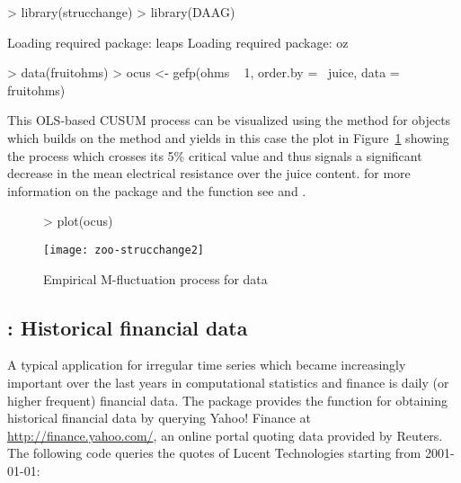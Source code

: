 \documentclass{Z}
\begin{document}
\begin{Schunk}
\begin{Sinput}
> library(strucchange)
> library(DAAG)
\end{Sinput}
\begin{Soutput}
Loading required package: leaps 
Loading required package: oz 
\end{Soutput}
\begin{Sinput}
> data(fruitohms)
> ocus <- gefp(ohms ~ 1, order.by = ~juice, data = fruitohms)
\end{Sinput}
\end{Schunk}

This OLS-based CUSUM process can be visualized using the  method
for  objects which builds on the  method and yields in
this case the plot in Figure~\ref{fig:strucchange} showing the process which
crosses its 5\% critical value and 
thus signals a significant decrease in the mean electrical resistance over the
juice content. for more information on the package  and the 
function  see \cite{zoo:Zeileis+Leisch+Hornik:2002} and 
\cite{zoo:Zeileis:2004}.

\begin{figure}
\begin{center}
\begin{Schunk}
\begin{Sinput}
> plot(ocus)
\end{Sinput}
\end{Schunk}
\texttt{[image: zoo-strucchange2]}
\caption{\label{fig:strucchange} Empirical M-fluctuation process for  data}
\end{center}
\end{figure}


\subsection[tseries: Historical financial data]{: Historical financial data}
\label{sec:tseries}

A typical application for irregular time series which became increasingly
important over the last years in computational statistics and finance is
daily (or higher frequent) financial data. The package  provides
the function  for obtaining historical financial data
by querying Yahoo! Finance at \url{http://finance.yahoo.com/},
an online portal quoting data provided by Reuters. The following code
queries the quotes of Lucent Technologies starting from 2001-01-01:
\end{document}
